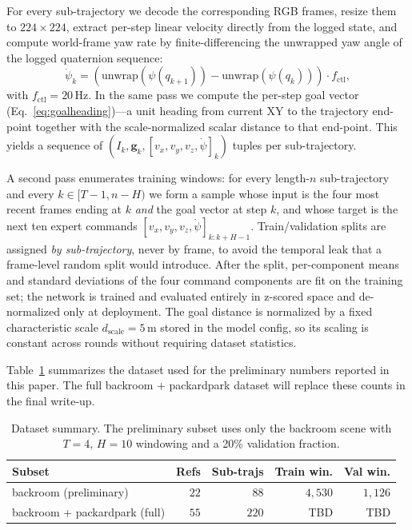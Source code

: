 \documentclass[10pt,twocolumn,letterpaper]{article}
\begin{document}
For every sub-trajectory we decode the corresponding RGB frames, resize them to $224\times224$, extract per-step linear velocity directly from the logged state, and compute world-frame yaw rate by finite-differencing the unwrapped yaw angle of the logged quaternion sequence:
\begin{equation}
\label{eq:psidot}
\dot{\psi}_k = (\mathrm{unwrap}(\psi(q_{k+1})) - \mathrm{unwrap}(\psi(q_k))) \cdot f_{\mathrm{ctl}},
\end{equation}
with $f_{\mathrm{ctl}} = 20\,\mathrm{Hz}$. In the same pass we compute the per-step goal vector (Eq.~\ref{eq:goalheading})---a unit heading from current XY to the trajectory end-point together with the scale-normalized scalar distance to that end-point. This yields a sequence of $(I_k, \mathbf{g}_k, [v_x, v_y, v_z, \dot{\psi}]_k)$ tuples per sub-trajectory.

A second pass enumerates training windows: for every length-$n$ sub-trajectory and every $k \in [T{-}1, n{-}H)$ we form a sample whose input is the four most recent frames ending at $k$ \emph{and} the goal vector at step $k$, and whose target is the next ten expert commands $[v_x, v_y, v_z, \dot{\psi}]_{k:k+H-1}$. Train/validation splits are assigned \emph{by sub-trajectory}, never by frame, to avoid the temporal leak that a frame-level random split would introduce. After the split, per-component means and standard deviations of the four command components are fit on the training set; the network is trained and evaluated entirely in z-scored space and de-normalized only at deployment. The goal distance is normalized by a fixed characteristic scale $d_{\mathrm{scale}}{=}5\,\mathrm{m}$ stored in the model config, so its scaling is constant across rounds without requiring dataset statistics.

Table~\ref{tab:dataset} summarizes the dataset used for the preliminary numbers reported in this paper. The full backroom + packardpark dataset will replace these counts in the final write-up.

\begin{table}[t]
\centering
\caption{Dataset summary. The preliminary subset uses only the backroom scene with $T{=}4$, $H{=}10$ windowing and a 20\% validation fraction.}
\label{tab:dataset}
\small
\begin{tabular}{@{}lrrrr@{}}
\toprule
Subset & Refs & Sub-trajs & Train win. & Val win. \\
\midrule
backroom (preliminary)         & $22$ & $\phantom{0}88$ & $4{,}530$ & $1{,}126$ \\
backroom + packardpark (full)  & $55$ & $220$           & TBD       & TBD       \\
\bottomrule
\end{tabular}
\end{table}
\end{document}
